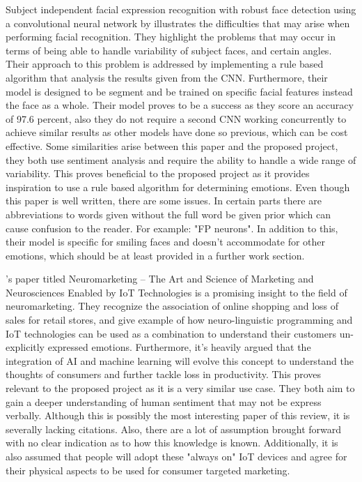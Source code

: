Subject independent facial expression recognition with robust face detection using a convolutional neural network by \citeauthor{MATSUGU} illustrates the difficulties that may arise when performing facial recognition. They highlight the problems that may occur in terms of being able to handle variability of subject faces, and certain angles. Their approach to this problem is addressed by implementing a rule based algorithm that analysis the results given from the CNN. Furthermore, their model is designed to be segment and be trained on specific facial features instead the face as a whole. Their model proves to be a success as they score an accuracy of 97.6 percent, also they do not require a second CNN working concurrently to achieve similar results as other models have done so previous, which can be cost effective. Some similarities arise between this paper and the proposed project, they both use sentiment analysis and require the ability to handle a wide range of variability. This proves beneficial to the proposed project as it provides inspiration to use a rule based algorithm for determining emotions. Even though this paper is well written, there are some issues. In certain parts there are abbreviations to words given without the full word be given prior which can cause confusion to the reader. For example: "FP neurons". In addition to this, their model is specific for smiling faces and doesn't accommodate for other emotions, which should be at least provided in a further work section. 

\citeauthor{arthmann}'s paper titled Neuromarketing – The Art and Science of Marketing and Neurosciences Enabled by IoT Technologies is a promising insight to the field of neuromarketing. They recognize the association of online shopping and loss of sales for retail stores, and give example of how neuro-linguistic programming and IoT technologies can be used as a combination to understand their customers un-explicitly expressed emotions. Furthermore, it's heavily argued that the integration of AI and machine learning will evolve this concept to understand the thoughts of consumers and further tackle loss in productivity. This proves relevant to the proposed project as it is a very similar use case. They both aim to gain a deeper understanding of human sentiment that may not be express verbally. Although this is possibly the most interesting paper of this review, it is severally lacking citations. Also, there are a lot of assumption brought forward with no clear indication as to how this knowledge is known. Additionally, it is also assumed that people will adopt these "always on" IoT devices and agree for their physical aspects to be used for consumer targeted marketing.
 
